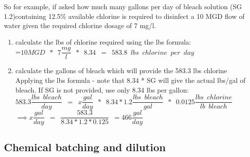 So for example, if asked how much many gallons per day of bleach solution (SG 1.2)containing 12.5\% available chlorine is required to disinfect a 10 MGD flow of water given the required chlorine dosage of 7 mg/l.\\
\begin{enumerate}
\item calculate the lbs of chlorine required using the lbs formula:\\
\vspace{0.5cm}
=$10 MGD \enspace * \enspace 7 \dfrac{mg}{l} \enspace * \enspace 8.34\enspace=\enspace 583.8 \enspace lbs \enspace chlorine \enspace per \enspace day$\\
\vspace{0.5cm}
\item calculate the gallons of bleach which will provide the 583.3 lbs chlorine\\
\vspace{0.5cm}
Applying the lbs formula - note that 8.34 * SG will give the actual lbs/gal of bleach.  If SG is not provided, use only 8.34 lbs per gallon:\\
\vspace{0.5cm}
$583.3 \dfrac{lbs \enspace bleach}{day}\enspace=\enspace x \dfrac{gal}{day} \enspace * \enspace 8.34 * 1.2 \dfrac{lbs \enspace bleach}{gal} \enspace * \enspace 0.0125 \dfrac{lbs \enspace chlorine}{lb \enspace bleach} \enspace $\\
\vspace{0.5cm}
$ \implies x \dfrac{gal}{day}\enspace = \enspace \dfrac{583.3}{8.34*1.2*0.125} \enspace = \boxed{466 \dfrac{gal}{day}}$
\end{enumerate}

\subsection{Chemical batching and dilution}

